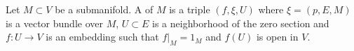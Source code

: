 Let $M \subset V$ be a submanifold. A  of $M$ is a triple $(f,\xi,U)$ where $\xi = (p,E,M)$ is a vector bundle over $M$, $U \subset E$ is a neighborhood of the zero section and $f: U \rightarrow V$ is an embedding such that $f|_M = 1_M$ and $f(U)$ is open in $V$.
